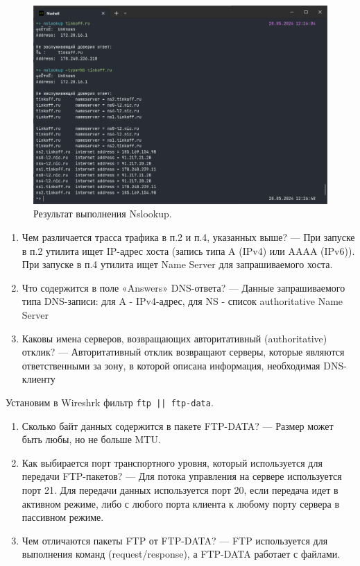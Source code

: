 \begin{figure}[h]
    \centering
    \includegraphics[width=1\linewidth]{res/nslookup-shell.png}
    \caption{Результат  выполнения Nslookup.}
    \label{fig:nslookup-shell}
\end{figure}

\begin{enumerate}
    \item Чем различается трасса трафика в п.2 и п.4, указанных выше? --- При запуске в п.2 утилита ищет IP-адрес хоста (запись типа A (IPv4) или AAAA (IPv6)).
    При запуске в п.4 утилита ищет Name Server для запрашиваемого хоста.
    \item Что содержится в поле «Answers» DNS-ответа? --- Данные запрашиваемого типа DNS-записи: для A - IPv4-адрес, для NS - список authoritative Name Server
    \item Каковы имена серверов, возвращающих авторитативный (authoritative) отклик? --- Авторитативный отклик возвращают серверы, которые являются ответственными 
    за зону, в которой описана информация, необходимая DNS-клиенту
\end{enumerate}


Установим в Wireshrk фильтр \verb/ftp || ftp-data/\;. 

\begin{enumerate}
    \item Сколько байт данных содержится в пакете FTP-DATA? --- Размер может быть любы, но не больше MTU.
    \item Как выбирается порт транспортного уровня, который используется для 
передачи FTP-пакетов? --- Для потока управления на сервере используется порт 21. Для передачи данных используется порт 20, если передача идет в активном режиме, либо с любого 
порта клиента к любому порту сервера в пассивном режиме.
    \item Чем отличаются пакеты FTP от FTP-DATA? --- FTP используется для выполнения команд (request/response), а FTP-DATA работает с файлами.
\end{enumerate}

